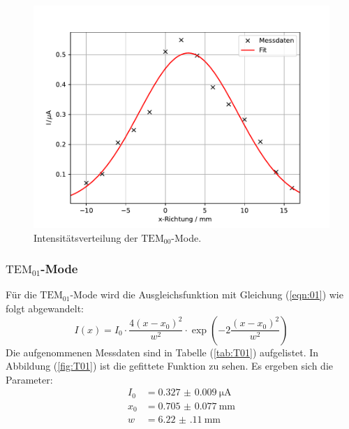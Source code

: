 \begin{figure}[h!]
  \centering
  \includegraphics[scale=0.7]{fig/plot2.pdf}
  \caption{Intensitätsverteilung der $\mathrm{TEM}_\mathrm{00}$-Mode.}
  \label{fig:T00}
\end{figure}
\FloatBarrier
\subsubsection{$\mathrm{TEM}_\mathrm{01}$-Mode}

Für die $\text{TEM}_{01}$-Mode wird die Ausgleichsfunktion mit Gleichung (\ref{eqn:01}) wie folgt abgewandelt:
\begin{equation}
  I(x) = I_\mathrm{0} \cdot \dfrac{4(x-x_\mathrm{0})^2}{w^2} \cdot \exp\left(-2\frac{(x-x_\mathrm{0})^2}{w^2}\right)
\end{equation}
Die aufgenommenen Messdaten sind in Tabelle (\ref{tab:T01}) aufgelistet.
In Abbildung (\ref{fig:T01}) ist die gefittete Funktion zu sehen.
Es ergeben sich die Parameter:
\begin{align*}
I_\mathrm{0} &= \SI{0.327(9)}{\micro\ampere}\\
x_\mathrm{0} &= \SI{0.705(77)}{\milli\meter}\\
w &= \SI{6.22(11)}{\milli\meter}
\end{align*}

